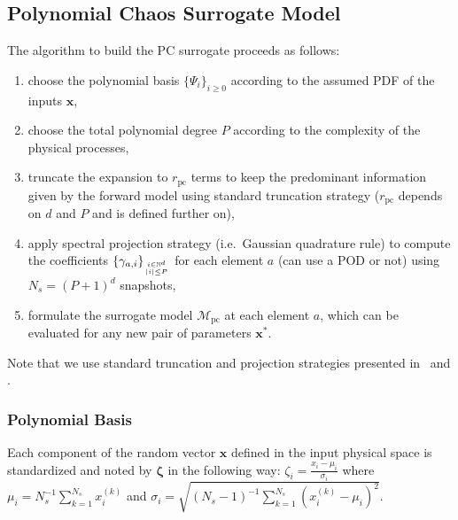 \bigskip
\subsection{Polynomial Chaos Surrogate Model}\label{sec:PC}

The algorithm to build the PC surrogate proceeds as follows:
\begin{enumerate}
\item choose the polynomial basis $\lbrace\Psi_{i}\rbrace_{i\geq 0}$ according to the assumed PDF of the inputs $\mathbf{x}$,
\item choose the total polynomial degree $P$ according to the complexity of the physical processes,
\item truncate the expansion to $r_{\text{pc}}$ terms to keep the predominant information given by the forward model using standard truncation strategy ($r_{\text{pc}}$ depends on $d$ and $P$ and is defined further on),
\item apply spectral projection strategy (i.e.~Gaussian quadrature rule) to compute the coefficients $\lbrace\gamma_{a,i}\rbrace_{i\in\mathbb{N}^d\atop|i|\leq P}$ for each element $a$ (can use a POD or not) using $N_{s} = (P+1)^{d}$ snapshots,
\item formulate the surrogate model $\mathcal{M}_{\text{pc}}$ at each element $a$, which can be evaluated for any new pair of parameters $\mathbf{x}^*$.
\end{enumerate}
Note that we use standard truncation and projection strategies presented in~\cite{lemaitreknio2010} and \cite{xiu2010}.

\subsubsection{Polynomial Basis}

Each component of the random vector $\mathbf{x}$ defined in the input physical space is standardized and noted by $\boldsymbol{\zeta}$ in the following way: $\zeta_i=\frac{x_i-\mu_i}{\sigma_i}$ where $\mu_i=N_{s}^{-1}\sum_{k=1}^{N_{s}}x_i^{(k)}$ and $\sigma_i=\sqrt{(N_{s}-1)^{-1}\sum_{k=1}^{N_{s}}\left(x_i^{(k)}-\mu_i\right)^2}$. 


